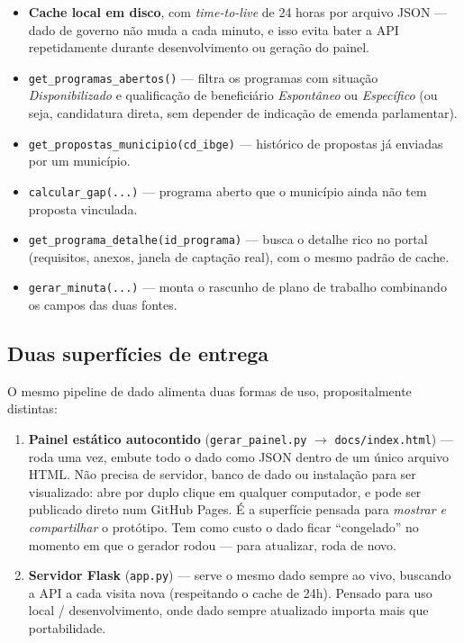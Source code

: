 \documentclass[11pt,a4paper]{article}
\newcommand{\codigo}[1]{\texttt{\small #1}}
\begin{document}
\begin{itemize}
  \item \textbf{Cache local em disco}, com \emph{time-to-live} de 24 horas por arquivo JSON
    --- dado de governo não muda a cada minuto, e isso evita bater a API repetidamente durante
    desenvolvimento ou geração do painel.
  \item \codigo{get\_programas\_abertos()} --- filtra os programas com situação
    \emph{Disponibilizado} e qualificação de beneficiário \emph{Espontâneo} ou
    \emph{Específico} (ou seja, candidatura direta, sem depender de indicação de emenda
    parlamentar).
  \item \codigo{get\_propostas\_municipio(cd\_ibge)} --- histórico de propostas já enviadas
    por um município.
  \item \codigo{calcular\_gap(...)} --- programa aberto que o município ainda não tem proposta
    vinculada.
  \item \codigo{get\_programa\_detalhe(id\_programa)} --- busca o detalhe rico no portal
    (requisitos, anexos, janela de captação real), com o mesmo padrão de cache.
  \item \codigo{gerar\_minuta(...)} --- monta o rascunho de plano de trabalho combinando os
    campos das duas fontes.
\end{itemize}

\subsection{Duas superfícies de entrega}

O mesmo pipeline de dado alimenta duas formas de uso, propositalmente distintas:

\begin{enumerate}
  \item \textbf{Painel estático autocontido} (\codigo{gerar\_painel.py}
    $\rightarrow$ \codigo{docs/index.html}) --- roda uma vez, embute todo o dado como JSON
    dentro de um único arquivo HTML. Não precisa de servidor, banco de dado ou instalação para
    ser visualizado: abre por duplo clique em qualquer computador, e pode ser publicado direto
    num GitHub Pages. É a superfície pensada para \emph{mostrar e compartilhar} o protótipo.
    Tem como custo o dado ficar ``congelado'' no momento em que o gerador rodou --- para
    atualizar, roda de novo.
  \item \textbf{Servidor Flask} (\codigo{app.py}) --- serve o mesmo dado sempre ao vivo,
    buscando a API a cada visita nova (respeitando o cache de 24h). Pensado para uso local /
    desenvolvimento, onde dado sempre atualizado importa mais que portabilidade.
\end{enumerate}
\end{document}
